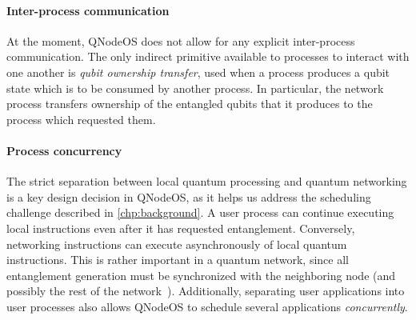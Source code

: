 \paragraph{Inter-process communication}

At the moment, QNodeOS does not allow for any explicit inter-process communication. The only
indirect primitive available to processes to interact with one another is \emph{qubit ownership
transfer}, used when a process produces a qubit state which is to be consumed by another process. In
particular, the network process transfers ownership of the entangled qubits that it produces to the
process which requested them.

\paragraph{Process concurrency}

The strict separation between local quantum processing and quantum networking is a key design
decision in QNodeOS, as it helps us address the scheduling challenge described in
\cref{chp:background}. A user process can continue executing local instructions even after it has
requested entanglement. Conversely, networking instructions can execute asynchronously of local
quantum instructions. This is rather important in a quantum network, since all entanglement
generation must be synchronized with the neighboring node (and possibly the rest of the
network~\cite{skrzypczyk_2021_arch}). Additionally, separating user applications into user processes
also allows QNodeOS to schedule several applications \emph{concurrently}.

